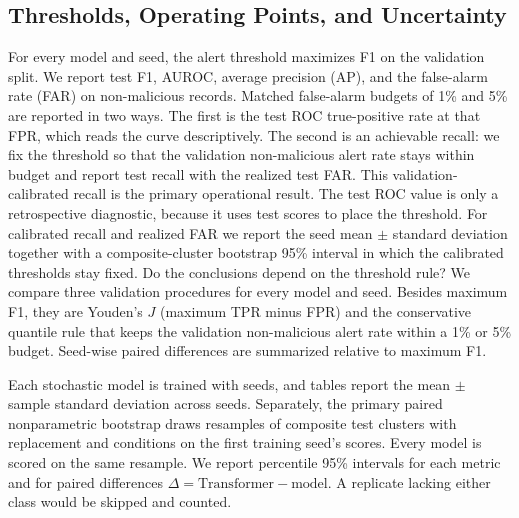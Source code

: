\documentclass[preprint,12pt,numafflabel]{elsarticle}
\begin{document}
\subsection{Thresholds, Operating Points, and Uncertainty}
For every model and seed, the alert threshold maximizes F1 on the validation split. We report test F1, AUROC, average precision (AP), and the false-alarm rate (FAR) on non-malicious records. Matched false-alarm budgets of 1\% and 5\% are reported in two ways. The first is the test ROC true-positive rate at that FPR, which reads the curve descriptively. The second is an achievable recall: we fix the threshold so that the validation non-malicious alert rate stays within budget and report test recall with the realized test FAR. This validation-calibrated recall is the primary operational result. The test ROC value is only a retrospective diagnostic, because it uses test scores to place the threshold. For calibrated recall and realized FAR we report the seed mean $\pm$ standard deviation together with a composite-cluster bootstrap 95\% interval in which the calibrated thresholds stay fixed. Do the conclusions depend on the threshold rule? We compare three validation procedures for every model and seed. Besides maximum F1, they are Youden's $J$ (maximum TPR minus FPR) and the conservative quantile rule that keeps the validation non-malicious alert rate within a 1\% or 5\% budget. Seed-wise paired differences are summarized relative to maximum F1.

Each stochastic model is trained with \ResSeeds{} seeds, and tables report the mean $\pm$ sample standard deviation across seeds. Separately, the primary paired nonparametric bootstrap draws \ResBootRequested{} resamples of composite test clusters with replacement and conditions on the first training seed's scores. Every model is scored on the same resample. We report percentile 95\% intervals for each metric and for paired differences $\Delta = \text{Transformer} - \text{model}$. A replicate lacking either class would be skipped and counted.
\end{document}
